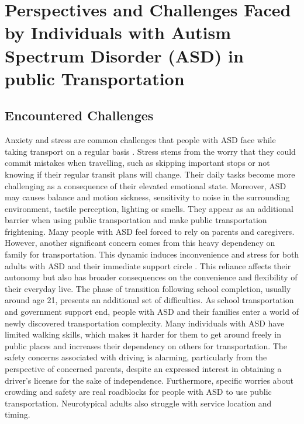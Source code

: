 \section{Perspectives and Challenges Faced by Individuals with Autism Spectrum Disorder (ASD) in public Transportation}
    
\subsection{Encountered Challenges}

    Anxiety and stress are common challenges that people with ASD face while taking transport on a regular basis \cite{haas_experiences_nodate}. Stress stems from the worry that they could commit mistakes when travelling, such as skipping important stops or not knowing if their regular transit plans will change. Their daily tasks become more challenging as a consequence of their elevated emotional state. 
    Moreover, ASD may causes balance and motion sickness, sensitivity to noise in the surrounding environment, tactile perception, lighting or smells. They appear as an additional barrier when using public transportation and make public transportation frightening.
\newline
\newline
    Many people with ASD feel forced to rely on parents and caregivers. However, another significant concern comes from this heavy dependency on family for transportation. This dynamic induces inconvenience and stress for both adults with ASD and their immediate support circle \cite{deka_co-principal_nodate}. This reliance affects their autonomy but also has broader consequences on the convenience and flexibility of their everyday live. 
    The phase of transition following school completion, usually around age 21, presents an additional set of difficulties. As school transportation and government support end,  people with ASD and their families enter a world of newly discovered transportation complexity.
    Many individuals with ASD have limited walking skills, which makes it harder for them to get around freely in public places and increases their dependency on others for transportation.
    The safety concerns associated with driving is alarming, particularly from the perspective of concerned parents, despite an expressed interest in obtaining a driver's license for the sake of independence. 
\newline
\newline
    Furthermore, specific worries about crowding and safety are real roadblocks for people with ASD to use public transportation. Neurotypical adults also struggle with service location and timing\cite{falkmer_viewpoints_2015}.
    

